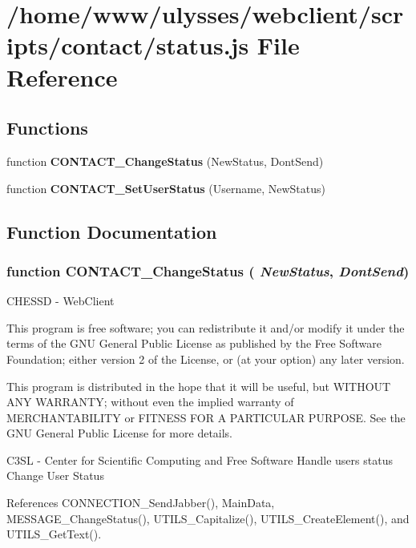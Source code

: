 \section{/home/www/ulysses/webclient/scripts/contact/status.js File Reference}
\label{status_8js}
\subsection*{Functions}
\begin{CompactItemize}
\item 
function {\bf CONTACT\_\-ChangeStatus} (NewStatus, DontSend)
\item 
function {\bf CONTACT\_\-SetUserStatus} (Username, NewStatus)
\end{CompactItemize}


\subsection{Function Documentation}
\subsubsection{\setlength{\rightskip}{0pt plus 5cm}function CONTACT\_\-ChangeStatus ( {\em NewStatus}, \/   {\em DontSend})}\label{status_8js_ea8c452eb196eeb0b9c7f04882827870}


CHESSD - WebClient

This program is free software; you can redistribute it and/or modify it under the terms of the GNU General Public License as published by the Free Software Foundation; either version 2 of the License, or (at your option) any later version.

This program is distributed in the hope that it will be useful, but WITHOUT ANY WARRANTY; without even the implied warranty of MERCHANTABILITY or FITNESS FOR A PARTICULAR PURPOSE. See the GNU General Public License for more details.

C3SL - Center for Scientific Computing and Free Software Handle users status Change User Status 

References CONNECTION\_\-SendJabber(), MainData, MESSAGE\_\-ChangeStatus(), UTILS\_\-Capitalize(), UTILS\_\-CreateElement(), and UTILS\_\-GetText().

